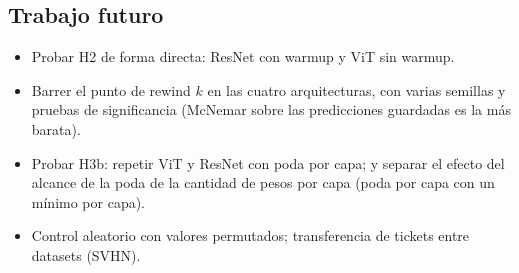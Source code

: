 \documentclass[11pt]{article}
\begin{document}
\subsection{Trabajo futuro}
\begin{itemize}[nosep]
    \item Probar H2 de forma directa: ResNet con warmup y ViT sin warmup.
    \item Barrer el punto de rewind $k$ en las cuatro arquitecturas, con varias semillas y pruebas de significancia (McNemar sobre las predicciones guardadas es la más barata).
    \item Probar H3b: repetir ViT y ResNet con poda por capa; y separar el efecto del alcance de la poda de la cantidad de pesos por capa (poda por capa con un mínimo por capa).
    \item Control aleatorio con valores permutados; transferencia de tickets entre datasets (SVHN).
\end{itemize}

\newpage
\printbibliography

\newpage
\appendix
\end{document}
